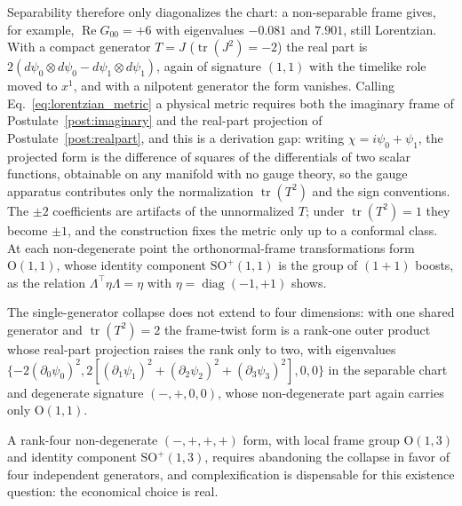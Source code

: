 Separability therefore only diagonalizes the chart: a non-separable frame gives, for example, $\operatorname{Re}G_{00} = +6$ with eigenvalues $-0.081$ and $7.901$, still Lorentzian. With a compact generator $T = J$ ($\operatorname{tr}(J^2) = -2$) the real part is $2(d\psi_0 \otimes d\psi_0 - d\psi_1 \otimes d\psi_1)$, again of signature $(1,1)$ with the timelike role moved to $x^1$, and with a nilpotent generator the form vanishes. Calling Eq.~\eqref{eq:lorentzian_metric} a physical metric requires both the imaginary frame of Postulate~\ref{post:imaginary} and the real-part projection of Postulate~\ref{post:realpart}, and this is a derivation gap: writing $\chi = i\psi_0 + \psi_1$, the projected form is the difference of squares of the differentials of two scalar functions, obtainable on any manifold with no gauge theory, so the gauge apparatus contributes only the normalization $\operatorname{tr}(T^2)$ and the sign conventions. The $\pm 2$ coefficients are artifacts of the unnormalized $T$; under $\operatorname{tr}(T^2) = 1$ they become $\pm 1$, and the construction fixes the metric only up to a conformal class. At each non-degenerate point the orthonormal-frame transformations form $\mathrm{O}(1,1)$, whose identity component $\mathrm{SO}^+(1,1)$ is the group of $(1{+}1)$ boosts, as the relation $\Lambda^\top\eta\Lambda = \eta$ with $\eta = \operatorname{diag}(-1,+1)$ shows.

\begin{proposition}\label{prop:rank_obstruction}
The single-generator collapse does not extend to four dimensions: with one shared generator and $\operatorname{tr}(T^2) = 2$ the frame-twist form is a rank-one outer product whose real-part projection raises the rank only to two, with eigenvalues $\{-2(\partial_0\psi_0)^2, 2[(\partial_1\psi_1)^2 + (\partial_2\psi_2)^2 + (\partial_3\psi_3)^2], 0, 0\}$ in the separable chart and degenerate signature $(-,+,0,0)$, whose non-degenerate part again carries only $\mathrm{O}(1,1)$.
\end{proposition}

A rank-four non-degenerate $(-,+,+,+)$ form, with local frame group $\mathrm{O}(1,3)$ and identity component $\mathrm{SO}^+(1,3)$, requires abandoning the collapse in favor of four independent generators, and complexification is dispensable for this existence question: the economical choice is real.

